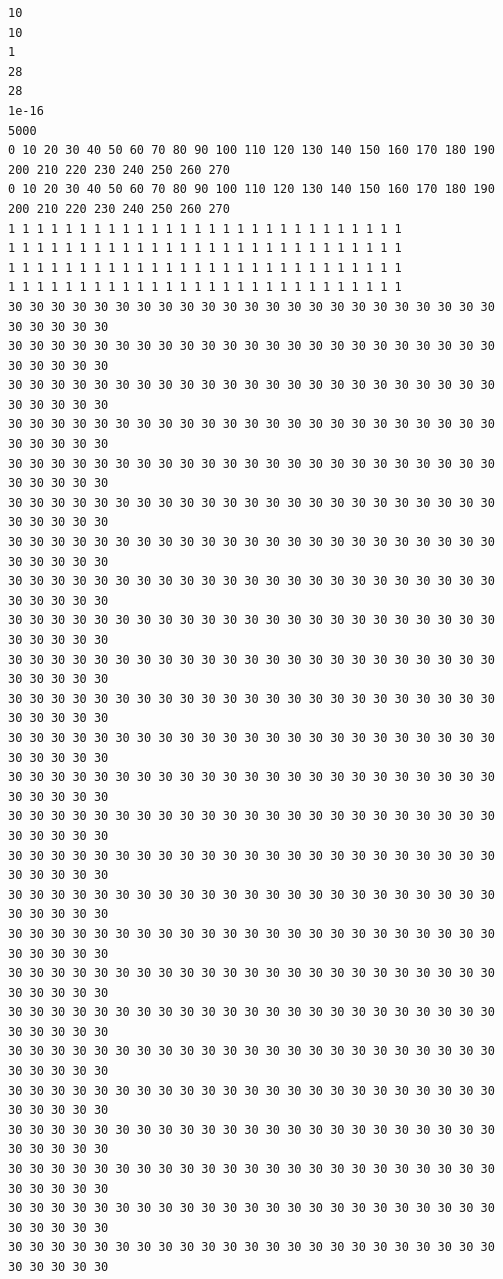 \begin{lstlisting}[caption= Input file for 4 well example , label=lst:wellfield]
10
10
1
28
28
1e-16
5000
0 10 20 30 40 50 60 70 80 90 100 110 120 130 140 150 160 170 180 190 200 210 220 230 240 250 260 270
0 10 20 30 40 50 60 70 80 90 100 110 120 130 140 150 160 170 180 190 200 210 220 230 240 250 260 270
1 1 1 1 1 1 1 1 1 1 1 1 1 1 1 1 1 1 1 1 1 1 1 1 1 1 1 1 
1 1 1 1 1 1 1 1 1 1 1 1 1 1 1 1 1 1 1 1 1 1 1 1 1 1 1 1
1 1 1 1 1 1 1 1 1 1 1 1 1 1 1 1 1 1 1 1 1 1 1 1 1 1 1 1
1 1 1 1 1 1 1 1 1 1 1 1 1 1 1 1 1 1 1 1 1 1 1 1 1 1 1 1 
30 30 30 30 30 30 30 30 30 30 30 30 30 30 30 30 30 30 30 30 30 30 30 30 30 30 30 30
30 30 30 30 30 30 30 30 30 30 30 30 30 30 30 30 30 30 30 30 30 30 30 30 30 30 30 30
30 30 30 30 30 30 30 30 30 30 30 30 30 30 30 30 30 30 30 30 30 30 30 30 30 30 30 30
30 30 30 30 30 30 30 30 30 30 30 30 30 30 30 30 30 30 30 30 30 30 30 30 30 30 30 30
30 30 30 30 30 30 30 30 30 30 30 30 30 30 30 30 30 30 30 30 30 30 30 30 30 30 30 30
30 30 30 30 30 30 30 30 30 30 30 30 30 30 30 30 30 30 30 30 30 30 30 30 30 30 30 30
30 30 30 30 30 30 30 30 30 30 30 30 30 30 30 30 30 30 30 30 30 30 30 30 30 30 30 30
30 30 30 30 30 30 30 30 30 30 30 30 30 30 30 30 30 30 30 30 30 30 30 30 30 30 30 30
30 30 30 30 30 30 30 30 30 30 30 30 30 30 30 30 30 30 30 30 30 30 30 30 30 30 30 30
30 30 30 30 30 30 30 30 30 30 30 30 30 30 30 30 30 30 30 30 30 30 30 30 30 30 30 30
30 30 30 30 30 30 30 30 30 30 30 30 30 30 30 30 30 30 30 30 30 30 30 30 30 30 30 30
30 30 30 30 30 30 30 30 30 30 30 30 30 30 30 30 30 30 30 30 30 30 30 30 30 30 30 30
30 30 30 30 30 30 30 30 30 30 30 30 30 30 30 30 30 30 30 30 30 30 30 30 30 30 30 30
30 30 30 30 30 30 30 30 30 30 30 30 30 30 30 30 30 30 30 30 30 30 30 30 30 30 30 30
30 30 30 30 30 30 30 30 30 30 30 30 30 30 30 30 30 30 30 30 30 30 30 30 30 30 30 30
30 30 30 30 30 30 30 30 30 30 30 30 30 30 30 30 30 30 30 30 30 30 30 30 30 30 30 30
30 30 30 30 30 30 30 30 30 30 30 30 30 30 30 30 30 30 30 30 30 30 30 30 30 30 30 30
30 30 30 30 30 30 30 30 30 30 30 30 30 30 30 30 30 30 30 30 30 30 30 30 30 30 30 30
30 30 30 30 30 30 30 30 30 30 30 30 30 30 30 30 30 30 30 30 30 30 30 30 30 30 30 30
30 30 30 30 30 30 30 30 30 30 30 30 30 30 30 30 30 30 30 30 30 30 30 30 30 30 30 30
30 30 30 30 30 30 30 30 30 30 30 30 30 30 30 30 30 30 30 30 30 30 30 30 30 30 30 30
30 30 30 30 30 30 30 30 30 30 30 30 30 30 30 30 30 30 30 30 30 30 30 30 30 30 30 30
30 30 30 30 30 30 30 30 30 30 30 30 30 30 30 30 30 30 30 30 30 30 30 30 30 30 30 30
30 30 30 30 30 30 30 30 30 30 30 30 30 30 30 30 30 30 30 30 30 30 30 30 30 30 30 30
30 30 30 30 30 30 30 30 30 30 30 30 30 30 30 30 30 30 30 30 30 30 30 30 30 30 30 30

\end{lstlisting}
